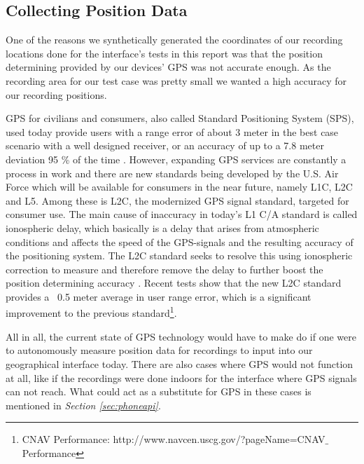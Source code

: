 \subsection{Collecting Position Data}
\label{sec:collectingpositiondata}
One of the reasons we synthetically generated the coordinates of our recording locations done for the interface’s tests in this report was that the position determining provided by our devices’ GPS was not accurate enough. As the recording area for our test case was pretty small we wanted a high accuracy for our recording positions. 

GPS for civilians and consumers, also called Standard Positioning System (SPS), used today provide users with a range error of about 3 meter in the best case scenario with a well designed receiver, or an accuracy of up to a 7.8 meter deviation 95 \% of the time \cite{spsperf}. However, expanding GPS services are constantly a process in work and there are new standards being developed by the U.S. Air Force which will be available for consumers in the near future, namely L1C, L2C and L5. Among these is L2C, the modernized GPS signal standard, targeted for consumer use. The main cause of inaccuracy in today’s L1 C/A standard is called ionospheric delay, which basically is a delay that arises from atmospheric conditions and affects the speed of the GPS-signals and the resulting accuracy of the positioning system. The L2C standard seeks to resolve this using ionospheric correction to measure and therefore remove the delay to further boost the position determining accuracy \cite{gpsdir}. Recent tests show that the new L2C standard provides a ~0.5 meter average in user range error, which is a significant improvement to the previous standard\footnote{CNAV Performance: http://www.navcen.uscg.gov/?pageName=CNAV$\_$Performance}.

All in all, the current state of GPS technology would have to make do if one were to autonomously measure position data for recordings to input into our geographical interface today. There are also cases where GPS would not function at all, like if the recordings were done indoors for the interface where GPS signals can not reach. What could act as a substitute for GPS in these cases is mentioned in \textit{Section \ref{sec:phoneapi}}.

